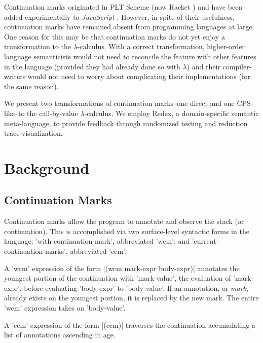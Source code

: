 \documentclass{llncs}
\newcommand{\lc}[0]{$\lambda$-calculus}
\begin{document}
Continuation marks originated in PLT Scheme (now Racket \cite{plt-tr1}) and have been added experimentally to \emph{JavaScript} \cite{clements2008implementing}. However, in spite of their usefulness, continuation marks have remained absent from programming languages at large. One reason for this may be that continuation marks do not yet enjoy a transformation to the \lc. With a correct transformation, higher-order language semanticists would not need to reconcile the feature with other features in the language (provided they had already done so with $\lambda$) and their compiler-writers would not need to worry about complicating their implementations (for the same reason).

We present two transformations of continuation marks--one direct and one CPS-like--to the call-by-value \lc. We employ Redex, a domain-specific semantic meta-language, to provide feedback through randomized testing and reduction trace visualization.

\section{Background}

\subsection{Continuation Marks}

Continuation marks allow the program to annotate and observe the stack (or continuation). This is accomplished via two surface-level syntactic forms in the language: \scheme'with-continuation-mark', abbreviated \scheme'wcm'; and \scheme'current-continuation-marks', abbreviated \scheme'ccm'.

A \scheme'wcm' expression of the form \scheme|(wcm mark-expr body-expr)| annotates the youngest portion of the continuation with \scheme'mark-value', the evaluation of \scheme'mark-expr', before evaluating \scheme'body-expr' to \scheme'body-value'. If an annotation, or \emph{mark}, already exists on the youngest portion, it is replaced by the new mark. The entire \scheme'wcm' expression takes on \scheme'body-value'.

A \scheme'ccm' expression of the form \scheme|(ccm)| traverses the continuation accumulating a list of annotations ascending in age.
\end{document}
